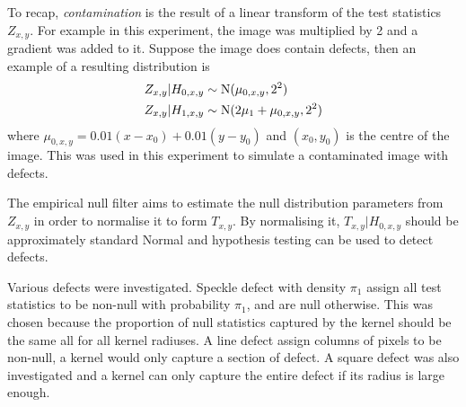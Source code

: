 To recap, \emph{contamination} is the result of a linear transform of the test statistics $Z_{x,y}$. For example in this experiment, the image was multiplied by 2 and a gradient was added to it. Suppose the image does contain defects, then an example of a resulting distribution is
\begin{align}
  Z_{x,y}|H_{0,x,y}&\sim\operatorname{N}(\mu_{0,x,y},2^2)
  \\
  Z_{x,y}|H_{1,x,y}&\sim\operatorname{N}(2\mu_1+\mu_{0,x,y},2^2)
\end{align}
where $\mu_{0,x,y}=0.01(x-x_0)+0.01(y-y_0)$ and $(x_0,y_0)$ is the centre of the image. This was used in this experiment to simulate a contaminated image with defects.

The empirical null filter aims to estimate the null distribution parameters from $Z_{x,y}$ in order to normalise it to form $T_{x,y}$. By normalising it, $T_{x,y}|H_{0,x,y}$ should be approximately standard Normal and hypothesis testing can be used to detect defects.

Various defects were investigated. Speckle defect with density $\pi_1$ assign all test statistics to be non-null with probability $\pi_1$, and are null otherwise. This was chosen because the proportion of null statistics captured by the kernel should be the same all for all kernel radiuses. A line defect assign columns of pixels to be non-null, a kernel would only capture a section of defect. A square defect was also investigated and a kernel can only capture the entire defect if its radius is large enough.

